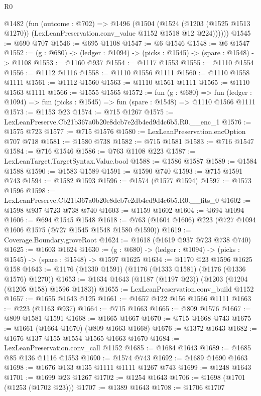 \begin{lexlean}{R0}
\begin{coremodule}
      @1482
        (fun (outcome : @702) =>
        @1496
          (@1504
            (@1524
              (@1203 (@1525 @1513 @1270))
              (LexLeanPreservation.conv_value @1152 @1518 @12 @224))))))
@1545 := @690 @707
@1546 := @695 @1108
@1547 := @6 @1546
@1548 := @6 @1547
@1552 := (g : @680) -> (ledger : @1094) -> (picks : @1545) -> (spare : @1548) -> @1108
@1553 := @1160 @937
@1554 := @1117 @1553
@1555 := @1110 @1554
@1556 := @1112 @1116
@1558 := @1110 @1556 @1111
@1560 := @1110 @1558 @1111
@1561 := @1112 @1560
@1563 := @1110 @1561 @1111
@1565 := @1110 @1563 @1111
@1566 := @1555 @1565
@1572 := fun (g : @680) =>
  fun (ledger : @1094) => fun (picks : @1545) => fun (spare : @1548) => @1110 @1566 @1111
@1573 := @1153 @23
@1574 := @715 @1267
@1575 := LexLeanPreserve.Cb21b367a0b20e8dcb7e2db4ed9d4c6b5.R0.__enc_1
@1576 := @1575 @723
@1577 := @715 @1576
@1580 := LexLeanPreservation.encOption @707 @718
@1581 := @1580 @738
@1582 := @715 @1581
@1583 := @716 @1547
@1584 := @716 @1546
@1586 := @763 @1108 @223
@1587 := LexLeanTarget.TargetSyntax.Value.bool
@1588 := @1586 @1587
@1589 := @1584 @1588
@1590 := @1583 @1589
@1591 := @1590 @740
@1593 := @715 @1591 @743
@1594 := @1582 @1593
@1596 := @1574 (@1577 @1594)
@1597 := @1573 @1596
@1598 := LexLeanPreserve.Cb21b367a0b20e8dcb7e2db4ed9d4c6b5.R0.__fits_0
@1602 := @1598 @937 @723 @738 @740
@1603 := @1159 @1602
@1604 := @694 @1094
@1606 := @694 @1545 @1548
@1618 := @763 (@1604 @1606) @223 (@727 @1094 @1606 @1575 (@727 @1545 @1548 @1580 @1590))
@1619 := Coverage.Boundary.groveRoot
@1624 := @1618 (@1619 @937 @723 @738 @740)
@1625 := @1603 @1624
@1630 := (g : @680) -> (ledger : @1094) -> (picks : @1545) -> (spare : @1548) -> @1597 @1625
@1634 := @1170 @23 @1596 @1625 @158
@1643 := @1176 (@1330 @1591) (@1176 (@1333 @1581) (@1176 (@1336 @1576) @1270))
@1653 := @1634 @1643 (@1187 (@1197 @23)) (@1203 (@1204 (@1205 @158) @1596 @1183))
@1655 := LexLeanPreservation.conv_build @1152
@1657 := @1655 @1643 @125
@1661 := @1657 @122 @156 @1566 @1111
@1663 := @223 (@1163 @937)
@1664 := @715 @1663
@1665 := @809 @1576
@1667 := @809 @1581 @1591
@1668 := @1665 @1667
@1670 := @715 @1668 @743
@1675 := @1661 (@1664 @1670) (@809 @1663 @1668)
@1676 := @1372 @1643
@1682 := @1676 @137 @155 @1554 @1565 @1663 @1670
@1684 := LexLeanPreservation.conv_call @1152
@1685 := @1684 @1643
@1689 := @1685 @85 @136 @1116 @1553
@1690 := @1574 @743
@1692 := @1689 @1690 @1663
@1698 := @1676 @133 @135 @1111 @1111 @1267 @743
@1699 := @1248 @1643
@1701 := @1699 @23 @1267
@1702 := @1254 @1643
@1706 := @1698 (@1701 (@1253 (@1702 @23)))
@1707 := @1389 @1643
@1708 := @1706 @1707

\end{coremodule}
\end{lexlean}
